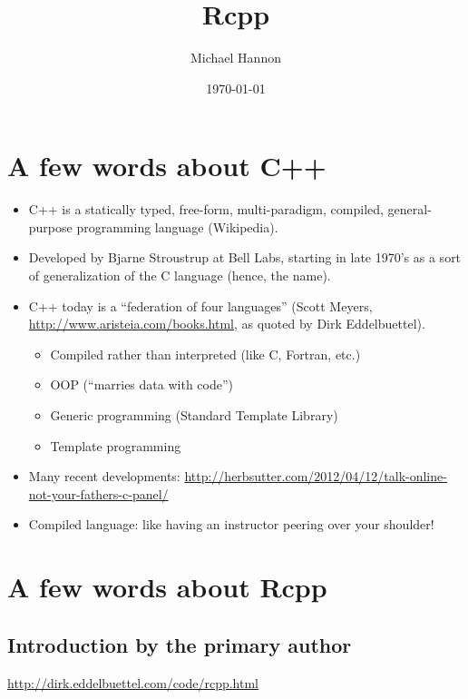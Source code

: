 \documentclass[11pt]{article}
\title{Rcpp}
\author{Michael Hannon}
\date{\today}
\begin{document}
\maketitle

\setcounter{tocdepth}{3}
\tableofcontents
\vspace*{1cm}



\section{A few words about C++}
\label{sec-1}


\begin{itemize}
\item C++ is a statically typed, free-form, multi-paradigm, compiled,
  general-purpose programming language (Wikipedia).
\item Developed by Bjarne Stroustrup at Bell Labs, starting in late 1970's
  as a sort of generalization of the C language (hence, the name).
\item C++ today is a ``federation of four languages'' (Scott Meyers,
  \href{http://www.aristeia.com/books.html}{http://www.aristeia.com/books.html}, as quoted by Dirk Eddelbuettel).
\begin{itemize}
\item Compiled rather than interpreted (like C, Fortran, etc.)
\item OOP (``marries data with code'')
\item Generic programming (Standard Template Library)
\item Template programming
\end{itemize}
\item Many recent developments:
  \href{http://herbsutter.com/2012/04/12/talk-online-not-your-fathers-c-panel/}{http://herbsutter.com/2012/04/12/talk-online-not-your-fathers-c-panel/}
\item Compiled language: like having an instructor peering over your
  shoulder!
\end{itemize}
\section{A few words about Rcpp}
\label{sec-2}
\subsection{Introduction by the primary author}
\label{sec-2-1}


    \href{http://dirk.eddelbuettel.com/code/rcpp.html}{http://dirk.eddelbuettel.com/code/rcpp.html}
\end{document}
